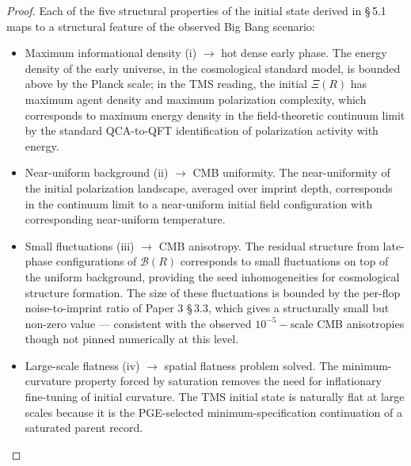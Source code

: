 \documentclass[11pt,oneside]{report}
\theoremstyle{definition}
\theoremstyle{remark}
\begin{document}
\begin{proof}
Each of the five structural properties of the initial
state derived in \S\,5.1 maps to a structural feature of the observed Big
Bang scenario:

\begin{itemize}
\item
  Maximum informational density (i) \ensuremath{\to} hot dense early phase. The energy
  density of the early universe, in the cosmological standard model, is
  bounded above by the Planck scale; in the TMS reading, the initial
  \ensuremath{\Xi (R)} has maximum agent density and maximum polarization complexity,
  which corresponds to maximum energy density in the field-theoretic
  continuum limit by the standard QCA-to-QFT identification of
  polarization activity with energy.
\end{itemize}

\begin{itemize}
\item
  Near-uniform background (ii) \ensuremath{\to} CMB uniformity. The near-uniformity of
  the initial polarization landscape, averaged over imprint depth,
  corresponds in the continuum limit to a near-uniform initial field
  configuration with corresponding near-uniform temperature.
\end{itemize}

\begin{itemize}
\item
  Small fluctuations (iii) \ensuremath{\to} CMB anisotropy. The residual structure from
  late-phase configurations of \ensuremath{\mathcal{B}(R)} corresponds to small fluctuations on
  top of the uniform background, providing the seed inhomogeneities for
  cosmological structure formation. The size of these fluctuations is
  bounded by the per-flop noise-to-imprint ratio of Paper 3 \S\,3.3, which
  gives a structurally small but non-zero value --- consistent with the
  observed \ensuremath{10^{-5}-\text{scale}} CMB anisotropies though not pinned numerically at
  this level.
\end{itemize}

\begin{itemize}
\item
  Large-scale flatness (iv) \ensuremath{\to} spatial flatness problem solved. The
  minimum-curvature property forced by saturation removes the need for
  inflationary fine-tuning of initial curvature. The TMS initial state
  is naturally flat at large scales because it is the PGE-selected
  minimum-specification continuation of a saturated parent record.
\end{itemize}


\end{proof}
\end{document}
